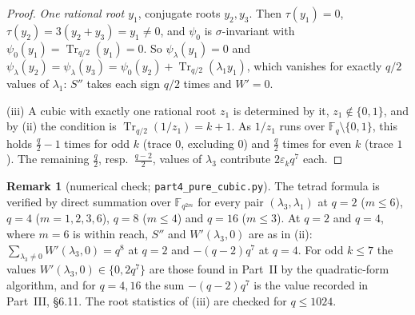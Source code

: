 \documentclass[12pt,a4paper]{amsart}
\theoremstyle{definition}
\newtheorem{remark}[theorem]{Remark}
\newcommand{\F}{\mathbb{F}}
\newcommand{\Tr}{\operatorname{Tr}}
\newcommand{\eps}{\varepsilon}
\newcommand{\Spp}{S''}
\begin{document}
\begin{proof}
\emph{One rational root $y_1$}, conjugate roots $y_2,y_3$. Then $\tau(y_1)=0$, $\tau(y_2)=3(y_2+y_3)=y_1\ne0$, and $\psi_0$ is $\sigma$-invariant with $\psi_0(y_1)=\Tr_{q/2}(y_1)=0$. So $\psi_\lambda(y_1)=0$ and $\psi_\lambda(y_2)=\psi_\lambda(y_3)=\psi_0(y_2)+\Tr_{q/2}(\lambda_1y_1)$, which vanishes for exactly $q/2$ values of $\lambda_1$: $\Spp$ takes each sign $q/2$ times and $W'=0$.

(iii) A cubic with exactly one rational root $z_1$ is determined by it, $z_1\notin\{0,1\}$, and by (ii) the condition is $\Tr_{q/2}(1/z_1)=k+1$. As $1/z_1$ runs over $\F_q\setminus\{0,1\}$, this holds $\frac q2-1$ times for odd $k$ (trace $0$, excluding $0$) and $\frac q2$ times for even $k$ (trace $1$). The remaining $\frac q2$, resp.\ $\frac{q-2}2$, values of $\lambda_3$ contribute $2\eps_kq^7$ each.
\end{proof}

\begin{remark}[numerical check; \texttt{part4\_pure\_cubic.py}]
The tetrad formula is verified by direct summation over $\F_{q^{2m}}$ for every pair $(\lambda_3,\lambda_1)$ at $q=2$ ($m\le6$), $q=4$ ($m=1,2,3,6$), $q=8$ ($m\le4$) and $q=16$ ($m\le3$). At $q=2$ and $q=4$, where $m=6$ is within reach, $\Spp$ and $W'(\lambda_3,0)$ are as in (ii): $\sum_{\lambda_3\ne0}W'(\lambda_3,0)=q^8$ at $q=2$ and $-(q-2)q^7$ at $q=4$. For odd $k\le7$ the values $W'(\lambda_3,0)\in\{0,2q^7\}$ are those found in Part~II by the quadratic-form algorithm, and for $q=4,16$ the sum $-(q-2)q^7$ is the value recorded in Part~III, \S6.11. The root statistics of (iii) are checked for $q\le1024$.
\end{remark}

\end{document}
